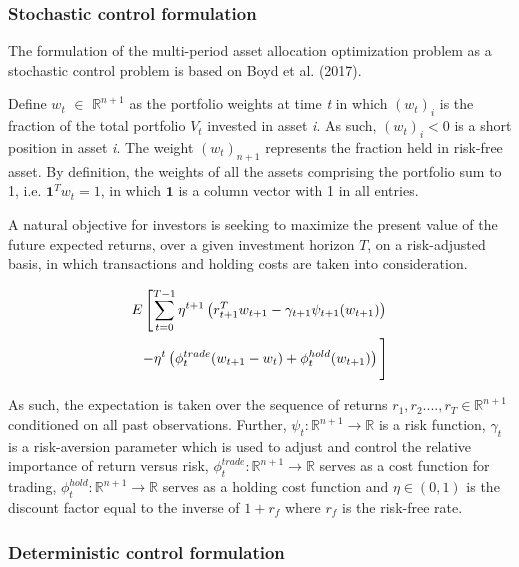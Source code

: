 \subsubsection{Stochastic control formulation}
The formulation of the multi-period asset allocation optimization problem as a stochastic control problem is based on Boyd et al. (2017). 

Define $w_t$ $\in$ $\mathbb{R}^{n+1}$ as the portfolio weights at time \textit{t} in which $(w_t)_{i}$ is the fraction of the total portfolio $V_t$ invested in asset \textit{i}. As such, $(w_t)_{i} < 0$ is a short position in asset \textit{i}. The weight $(w_t)_{{n+1}}$ represents the fraction held in risk-free asset. By definition, the weights of all the assets comprising the portfolio sum to 1, i.e. $\mathbf{1}^Tw_t = 1$, in which $\mathbf{1}$ is a column vector with 1 in all entries. 

A natural objective for investors is seeking to maximize the present value of the future expected returns, over a given investment horizon $T$, on a risk-adjusted basis, in which transactions and holding costs are taken into consideration.

\begin{equation}
\begin{split}
    E\left[\sum_{t=0}^{T-1}\eta^{t+1}\left(r_{t+1}^Tw_{t+1} -\gamma_{t+1}\psi_{t+1}(w_{t+1})\right) \right. \\
    \left. -\eta^t\left(\phi_t^{trade}(w_{t+1}-w_t)+\phi_t^{hold}(w_{t+1})\right)
    \vphantom{\sum_{t=0}^{T-1}} \right]
    \label{eq: MPC_stochastic}
\end{split}
\end{equation}

As such, the expectation is taken over the sequence of returns $r_1, r_2...., r_T \in \mathbb{R}^{n+1}$ conditioned on all past observations. Further, $\psi_t:\mathbb{R}^{n+1} \rightarrow \mathbb{R}$ is a risk function, $\gamma_t$ is a risk-aversion parameter which is used to adjust and control the relative importance of return versus risk, $\phi_t^{trade}: \mathbb{R}^{n+1}\rightarrow\mathbb{R}$ serves as a cost function for trading, $\phi_t^{hold}: \mathbb{R}^{n+1}\rightarrow\mathbb{R}$ serves as a holding cost function and $\eta \in (0,1)$ is the discount factor equal to the inverse of $1+r_f$ where $r_f$ is the risk-free rate.  

\subsubsection{Deterministic control formulation}

